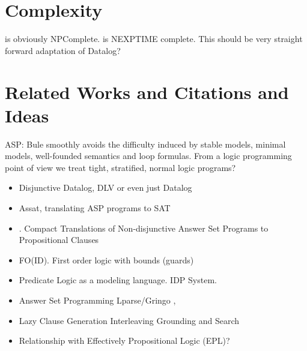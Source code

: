 \documentclass[conference]{IEEEtran}
\begin{document}
\section{Complexity}

\bflat is obviously NPComplete. 
\bfull is NEXPTIME complete. 
This should be very straight forward adaptation of Datalog?

\section{Related Works and Citations and Ideas}

ASP: Bule smoothly avoids the difficulty induced by stable models, minimal models, well-founded 
semantics and loop formulas. From a logic programming point of view we treat tight, stratified, normal logic programs?

\begin{itemize}
    \item Disjunctive Datalog, DLV \cite{Eiter97} or even just Datalog \cite{Gottlob89}
    \item Assat, translating ASP programs to SAT \cite{Lin04}
    \item \cite{Janhunen11}. Compact Translations of Non-disjunctive Answer Set
        Programs to Propositional Clauses
    \item FO(ID). First order logic with bounds (guards) \cite{Wittocx10}
    \item Predicate Logic as a modeling language. IDP System. \cite{Cat18}
    \item Answer Set Programming Lparse/Gringo \cite{Gebser15}, \cite{Ferraris05}
    \item Lazy Clause Generation Interleaving Grounding and Search \cite{Cat15}
    \item Relationship with Effectively Propositional Logic (EPL)? 
\end{itemize}



\end{document}

